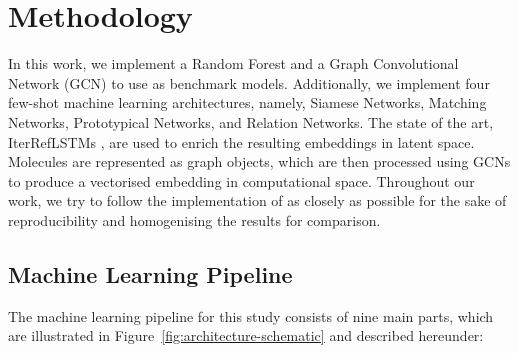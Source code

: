 \section{Methodology}

In this work, we implement a Random Forest and a Graph Convolutional Network (GCN) to use as benchmark models. Additionally, we implement four few-shot machine learning architectures, namely, Siamese Networks, Matching Networks, Prototypical Networks, and Relation Networks. The state of the art, IterRefLSTMs \citep{altae2017low}, are used to enrich the resulting embeddings in latent space. Molecules are represented as graph objects, which are then processed using GCNs to produce a vectorised embedding in computational space. Throughout our work, we try to follow the implementation of \citet{altae2017low} as closely as possible for the sake of reproducibility and homogenising the results for comparison.

\subsection{Machine Learning Pipeline}

The machine learning pipeline for this study consists of nine main parts, which are illustrated in Figure~\ref{fig:architecture-schematic} and described hereunder:

